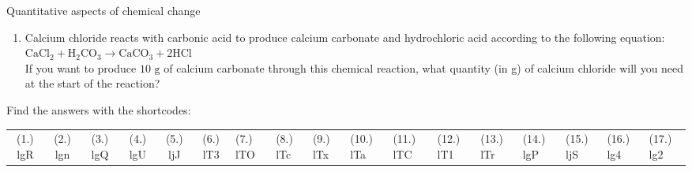 \begin{eocexercises}{Quantitative aspects of chemical change}
\begin{enumerate}[noitemsep, label=\textbf{\arabic*}. ]
\begin{enumerate}[noitemsep, label=\textbf{\alph*}. ]
 \item It is found that $275~\text{g}$ of zinc sulphide was produced. Calculate the \% yield.
 \end{enumerate}
\item Calcium chloride reacts with carbonic acid to produce calcium carbonate and hydrochloric acid according to the following equation:\\
${\text{CaCl}}_{2}+{\text{H}}_{2}{\text{CO}}_{3}\to {\text{CaCO}}_{3}+2\text{HCl}$\\
If you want to produce $10 \text{ g}$ of calcium carbonate through this chemical reaction, what quantity (in g) of calcium chloride will you need at the start of the reaction?
                \end{enumerate}
\practiceinfo
\par {} Find the answers with the shortcodes:
 \par \begin{tabular}[h]{cccccc}
 (1.) lgR  &  (2.) lgn  &  (3.) lgQ  &  (4.) lgU  &  (5.) ljJ  &  (6.) lT3  &  (7.) lTO  &  (8.) lTc  &  (9.) lTx  &  (10.) lTa  &  (11.) lTC  &  (12.) lT1  &  (13.) lTr  &  (14.) lgP  &  (15.) ljS  & (16.) lg4 & (17.) lg2 \end{tabular}
\end{eocexercises}
